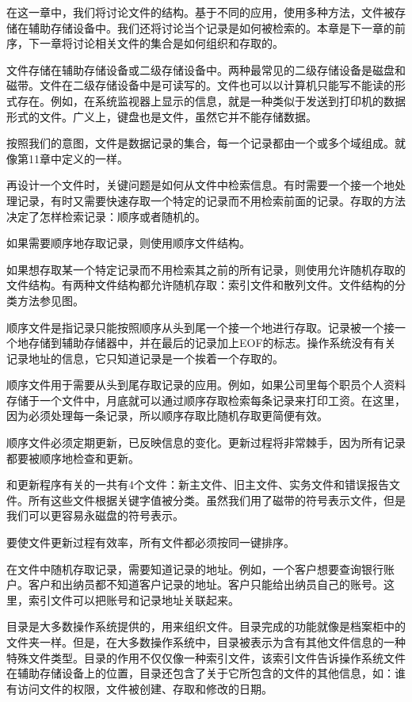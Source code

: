 
在这一章中，我们将讨论文件的结构。基于不同的应用，使用多种方法，文件被存储在辅助存储设备中。我们还将讨论当个记录是如何被检索的。本章是下一章的前序，下一章将讨论相关文件的集合是如何组织和存取的。\par
文件存储在辅助存储设备或二级存储设备中。两种最常见的二级存储设备是磁盘和磁带。文件在二级存储设备中是可读写的。文件也可以以计算机只能写不能读的形式存在。例如，在系统监视器上显示的信息，就是一种类似于发送到打印机的数据形式的文件。广义上，键盘也是文件，虽然它并不能存储数据。\par
按照我们的意图，文件是数据记录的集合，每一个记录都由一个或多个域组成。就像第11章中定义的一样。\par
再设计一个文件时，关键问题是如何从文件中检索信息。有时需要一个接一个地处理记录，有时又需要快速存取一个特定的记录而不用检索前面的记录。存取的方法决定了怎样检索记录：顺序或者随机的。\par
如果需要顺序地存取记录，则使用顺序文件结构。\par
如果想存取某一个特定记录而不用检索其之前的所有记录，则使用允许随机存取的文件结构。有两种文件结构都允许随机存取：索引文件和散列文件。文件结构的分类方法参见图。\par
顺序文件是指记录只能按照顺序从头到尾一个接一个地进行存取。记录被一个接一个地存储到辅助存储器中，并在最后的记录加上EOF的标志。操作系统没有有关记录地址的信息，它只知道记录是一个挨着一个存取的。\par
顺序文件用于需要从头到尾存取记录的应用。例如，如果公司里每个职员个人资料存储于一个文件中，月底就可以通过顺序存取检索每条记录来打印工资。在这里，因为必须处理每一条记录，所以顺序存取比随机存取更简便有效。\par
顺序文件必须定期更新，已反映信息的变化。更新过程将非常棘手，因为所有记录都要被顺序地检查和更新。\par
和更新程序有关的一共有4个文件：新主文件、旧主文件、实务文件和错误报告文件。所有这些文件根据关键字值被分类。虽然我们用了磁带的符号表示文件，但是我们可以更容易永磁盘的符号表示。\par
要使文件更新过程有效率，所有文件都必须按同一键排序。\par
在文件中随机存取记录，需要知道记录的地址。例如，一个客户想要查询银行账户。客户和出纳员都不知道客户记录的地址。客户只能给出纳员自己的账号。这里，索引文件可以把账号和记录地址关联起来。\par
目录是大多数操作系统提供的，用来组织文件。目录完成的功能就像是档案柜中的文件夹一样。但是，在大多数操作系统中，目录被表示为含有其他文件信息的一种特殊文件类型。目录的作用不仅仅像一种索引文件，该索引文件告诉操作系统文件在辅助存储设备上的位置，目录还包含了关于它所包含的文件的其他信息，如：谁有访问文件的权限，文件被创建、存取和修改的日期。\par
